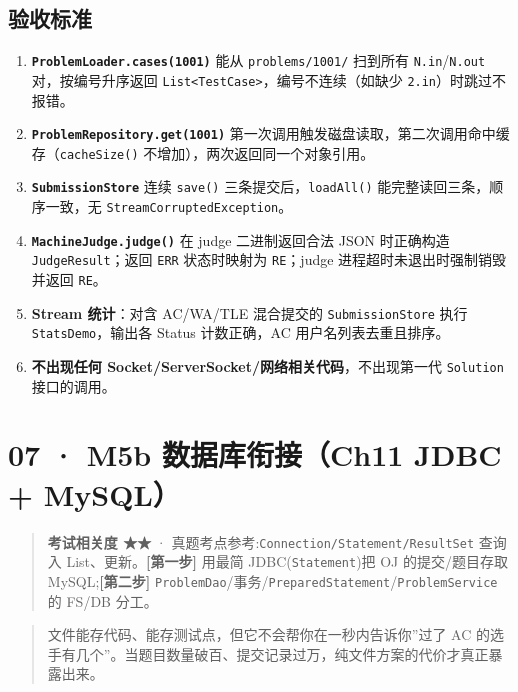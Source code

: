 \documentclass[
  11pt,
]{ctexart}
\begin{document}
\hypertarget{ux9a8cux6536ux6807ux51c6-5}{%
\subsection{验收标准}\label{ux9a8cux6536ux6807ux51c6-5}}

\begin{enumerate}
\def\labelenumi{\arabic{enumi}.}
\item
  \textbf{\texttt{ProblemLoader.cases(1001)}} 能从
  \texttt{problems/1001/} 扫到所有 \texttt{N.in}/\texttt{N.out}
  对，按编号升序返回
  \texttt{List\textless{}TestCase\textgreater{}}，编号不连续（如缺少
  \texttt{2.in}）时跳过不报错。
\item
  \textbf{\texttt{ProblemRepository.get(1001)}}
  第一次调用触发磁盘读取，第二次调用命中缓存（\texttt{cacheSize()}
  不增加），两次返回同一个对象引用。
\item
  \textbf{\texttt{SubmissionStore}} 连续 \texttt{save()}
  三条提交后，\texttt{loadAll()} 能完整读回三条，顺序一致，无
  \texttt{StreamCorruptedException}。
\item
  \textbf{\texttt{MachineJudge.judge()}} 在 judge 二进制返回合法 JSON
  时正确构造 \texttt{JudgeResult}；返回 \texttt{ERR} 状态时映射为
  \texttt{RE}；judge 进程超时未退出时强制销毁并返回 \texttt{RE}。
\item
  \textbf{Stream 统计}：对含 AC/WA/TLE 混合提交的
  \texttt{SubmissionStore} 执行 \texttt{StatsDemo}，输出各 Status
  计数正确，AC 用户名列表去重且排序。
\item
  \textbf{不出现任何 Socket/ServerSocket/网络相关代码}，不出现第一代
  \texttt{Solution} 接口的调用。
\end{enumerate}

\hypertarget{m5b-ux6570ux636eux5e93ux8854ux63a5ch11-jdbc-mysql}{%
\section{07 · M5b 数据库衔接（Ch11 JDBC +
MySQL）}\label{m5b-ux6570ux636eux5e93ux8854ux63a5ch11-jdbc-mysql}}

\begin{quote}
\textbf{考试相关度 ★★} ·
真题考点参考:\texttt{Connection/Statement/ResultSet} 查询入
List、更新。\textbf{{[}第一步{]}} \KS 用最简 JDBC(\texttt{Statement})把
OJ 的提交/题目存取 MySQL;\textbf{{[}第二步{]}}
\GC \texttt{ProblemDao}/事务/\texttt{PreparedStatement}/\texttt{ProblemService}
的 FS/DB 分工。
\end{quote}

\begin{quote}
文件能存代码、能存测试点，但它不会帮你在一秒内告诉你''过了 AC
的选手有几个''。当题目数量破百、提交记录过万，纯文件方案的代价才真正暴露出来。
\end{quote}
\end{document}
